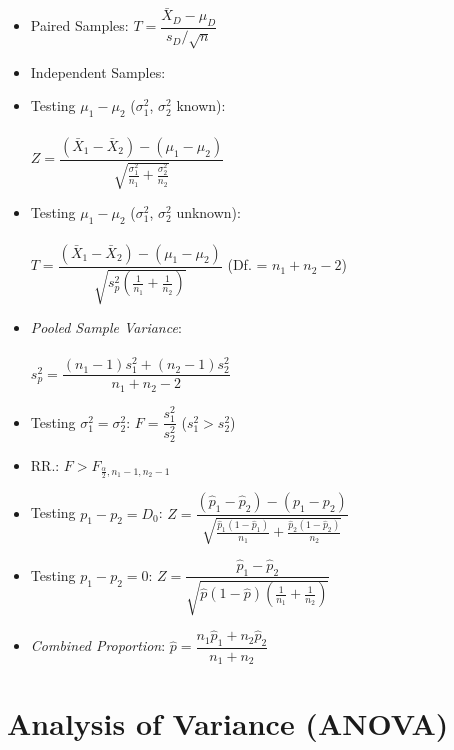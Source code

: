 \documentclass[%
 aip,
 jmp,%
 amsmath,amssymb,
 reprint,%
]{revtex4-1}
\begin{document}
\begin{itemize}[label={}]
\item Paired Samples: $T = \dfrac{\bar{X}_D - \mu_D}{s_D / \sqrt{n}}$
\item Independent Samples: 
\item Testing $\mu_1-\mu_2$ ($\sigma_1^2$, $\sigma_2^2$ known):\\\\ 
$Z = \dfrac{(\bar{X}_1-\bar{X}_2) - (\mu_1-\mu_2)}{\sqrt{\frac{\sigma_1^2}{n_1} + \frac{\sigma_2^2}{n_2}}}$
\item Testing $\mu_1-\mu_2$ ($\sigma_1^2$, $\sigma_2^2$ unknown): \\\\
$T = \dfrac{(\bar{X}_1-\bar{X}_2) - (\mu_1-\mu_2)}{\sqrt{s_p^2\left(\frac{1}{n_1}+\frac{1}{n_2}\right)}}$ {\small (Df. =  $n_1+n_2-2$)}
\item {\small \textit{Pooled Sample Variance}:\\\\
$s_p^2 = \dfrac{(n_1-1)s_1^2 + (n_2-1)s_2^2}{n_1+n_2-2}$}
\item Testing $\sigma_1^2 = \sigma_2^2$: $F=\dfrac{s_1^2}{s_2^2}$ ($s_1^2>s_2^2$) 
\item {\small RR.: $F > F_{\frac{\alpha}{2}, n_1-1, n_2-1}$}
\item Testing $p_1-p_2=D_0$: $Z = \dfrac{(\hat{p}_1-\hat{p}_2) - (p_1-p_2)}{\sqrt{\frac{\hat{p}_1(1-\hat{p}_1)}{n_1} + \frac{\hat{p}_2(1-\hat{p}_2)}{n_2}}}$ \\
\item Testing $p_1-p_2=0$: $Z = \dfrac{\hat{p}_1-\hat{p}_2}{\sqrt{\hat{p}(1-\hat{p})\left(\frac{1}{n_1}+\frac{1}{n_2}\right)}}$
\item {\small \textit{Combined Proportion}: $\hat{p} = \dfrac{n_1\hat{p}_1+n_2\hat{p}_2}{n_1+n_2}$}
\end{itemize}


\section{Analysis of Variance (ANOVA)}
\end{document}
